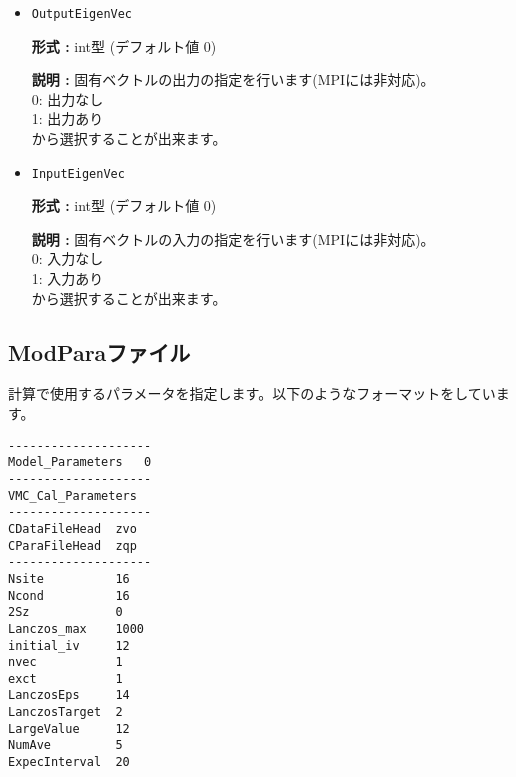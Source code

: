 \begin{itemize}
{\bf 形式 :} int型 (デフォルト値 0)

{\bf 説明 :} 固有ベクトルの初期値の型の指定を行います。\\
0: 複素数\\
1: 実数\\
から選択することが出来ます。

\item  \verb|OutputEigenVec|

{\bf 形式 :} {int型 (デフォルト値 0)}

{\bf 説明 :} {固有ベクトルの出力の指定を行います(MPIには非対応)。\\
0: 出力なし\\
1: 出力あり\\
から選択することが出来ます。}

\item  \verb|InputEigenVec|

{\bf 形式 :} {int型 (デフォルト値 0)}

{\bf 説明 :} {固有ベクトルの入力の指定を行います(MPIには非対応)。\\
0: 入力なし\\
1: 入力あり\\
から選択することが出来ます。}

\end{itemize}

\newpage
\subsection{ModParaファイル}
\label{Subsec:modpara}
計算で使用するパラメータを指定します。以下のようなフォーマットをしています。\\
\begin{minipage}{10cm}
\begin{screen}
\begin{verbatim}
--------------------
Model_Parameters   0
--------------------
VMC_Cal_Parameters
--------------------
CDataFileHead  zvo
CParaFileHead  zqp
--------------------
Nsite          16   
Ncond          16    
2Sz            0    
Lanczos_max    1000 
initial_iv     12   
nvec           1    
exct           1    
LanczosEps     14   
LanczosTarget  2    
LargeValue     12   
NumAve         5    
ExpecInterval  20   
\end{verbatim}
\end{screen}
\end{minipage}


